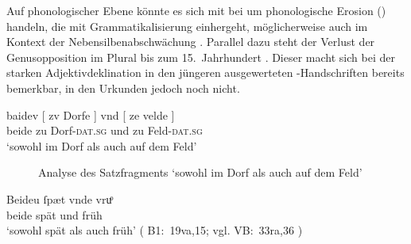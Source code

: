 Auf phonologischer Ebene könnte es sich mit \citet[134--136]{lehmann2015} bei
 um phonologische Erosion () handeln,
die mit Grammatikalisierung einhergeht, möglicherweise auch im Kontext der
Nebensilbenabschwächung \autocite[88--92]{braune2018}. Parallel dazu steht der
Verlust der Genusopposition im Plural bis zum 15.~Jahrhundert
\autocites[203]{paul2007}[191--192]{reichmannwegera1993}. Dieser macht sich bei
der starken Adjektivdeklination in den jüngeren ausgewerteten
\KC{}-Handschriften bereits bemerkbar, in den Urkunden jedoch noch nicht.

\begin{exe}
\ex \label{ex:beidquantsyncont}
	\begin{xlist}
	\ex \label{ex:caokoordsyn_3_2}
		\gll baidev \textup{[} zv Dorfe \textup{]} vnd
				\textup{[} ze velde \textup{]} \\
			beide {} zu Dorf-\textsc{dat.sg} {} und {} zu Feld-\textsc{dat.sg}
				{} \\
		\trans `sowohl im Dorf als auch auf dem Feld'
			\parencites(Nr.~3319, Michelstetten, Bz.~Mistelbach, 1299)[461,28]{cao4}

		\begin{figure}
		\caption{Analyse des Satzfragments  `sowohl im Dorf als auch auf dem Feld'}
		\label{fig:caokoordsyn_3_2}
		\end{figure}

	\ex \label{ex:syntintvar1_2}
		\gll Beideu {\ob} ſpæt {\cb} vnde
			{\ob} vruͦ {\cb} \\
			beide {} spät {} und {} früh {} \\
		\trans `sowohl spät als auch früh'
			(%
				B1:~19va,15; vgl.
				VB:~33ra,36%
			)


\end{xlist}
\end{exe}
